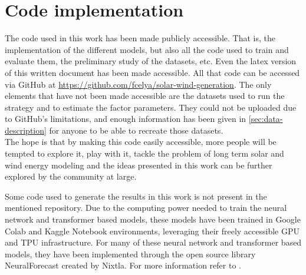\section{Code implementation}
\label{sec:code}
The code used in this work has been made publicly accessible. That is, the implementation of the different models, but also all the code used to train and evaluate them, the preliminary study of the datasets, etc. Even the latex version of this written document has been made accessible. All that code can be accessed via GitHub at \href{https://github.com/fcelya/solar-wind-generation}{https://github.com/fcelya/solar-wind-generation}. The only elements that have not been made accessible are the datasets used to run the strategy and to estimate the factor parameters. They could not be uploaded due to GitHub's limitations, and enough information has been given in \autoref{sec:data-description} for anyone to be able to recreate those datasets. \\ The hope is that by making this code easily accessible, more people will be tempted to explore it, play with it, tackle the problem of long term solar and wind energy modeling and the ideas presented in this work can be further explored by the community at large.

Some code used to generate the results in this work is not present in the mentioned repository. Due to the computing power needed to train the neural network and transformer based models, these models have been trained in Google Colab and Kaggle Notebook environments, leveraging their freely accessible GPU and TPU infrastructure. For many of these neural network and transformer based models, they have been implemented through the open source library NeuralForecast created by Nixtla. For more information refer to \cite{olivares2022library_neuralforecast}.